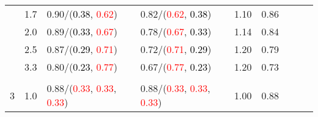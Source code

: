 \documentclass[10pt,a4paper]{report}
\begin{document}
\begin{table}[!htbp]
\begin{center}
{\begin{tabular}{ccllccccc}
				  & 1.7                               & 0.90/(\textcolor{black}{0.38}, \textcolor{red}{0.62})                                                                                                                                         & 0.82/(\textcolor{red}{0.62}, \textcolor{black}{0.38})                                                                                                                                         & 1.10             & 0.86                     \\
				  & 2.0                               & 0.89/(\textcolor{black}{0.33}, \textcolor{red}{0.67})                                                                                                                                         & 0.78/(\textcolor{red}{0.67}, \textcolor{black}{0.33})                                                                                                                                         & 1.14             & 0.84                     \\
				  & 2.5                               & 0.87/(\textcolor{black}{0.29}, \textcolor{red}{0.71})                                                                                                                                         & 0.72/(\textcolor{red}{0.71}, \textcolor{black}{0.29})                                                                                                                                         & 1.20             & 0.79                     \\
				  & 3.3                               & 0.80/(\textcolor{black}{0.23}, \textcolor{red}{0.77})                                                                                                                                         & 0.67/(\textcolor{red}{0.77}, \textcolor{black}{0.23})                                                                                                                                         & 1.20             & 0.73                     \\
				  &                                   &                                                                                                                                                                                               &                                                                                                                                                                                               &                                             \\
				3 & 1.0                               & 0.88/(\textcolor{red}{0.33}, \textcolor{red}{0.33}, \textcolor{red}{0.33})                                                                                                                    & 0.88/(\textcolor{red}{0.33}, \textcolor{red}{0.33}, \textcolor{red}{0.33})                                                                                                                    & 1.00             & 0.88                     \\

\end{tabular}}
\end{center}
\end{table}
\end{document}
